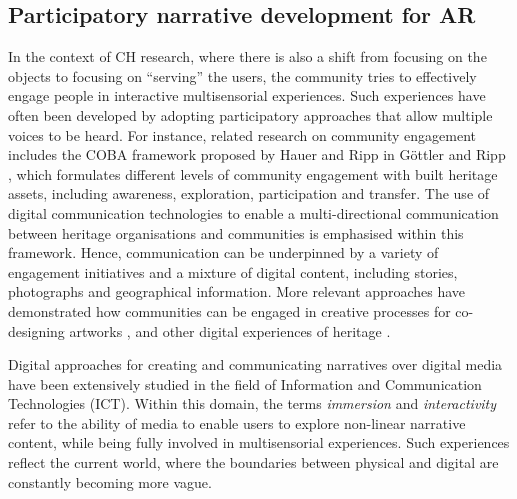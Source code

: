 \documentclass[acmlarge,screen,dvipsnames]{acmart}
\begin{document}
\subsection{Participatory narrative development for AR}
In the context of CH research, where there is also a shift from focusing on the objects to focusing on ``serving'' the users, the community tries to effectively engage people in interactive multisensorial experiences. Such experiences have often been developed by adopting participatory approaches that allow multiple voices to be heard. \color{black}
For instance, related research on community engagement includes the COBA framework proposed by Hauer and Ripp in G{\"o}ttler and Ripp
\cite{icomos1812}, which formulates different levels of community engagement
with built heritage assets, including awareness, exploration, participation
and transfer. The use of digital communication technologies to
enable a multi-directional communication between heritage organisations and
communities is emphasised within this framework. Hence, communication can be underpinned by a variety of engagement initiatives and a mixture of digital content, including stories, photographs and geographical information. More relevant approaches have demonstrated how
communities can be engaged in creative processes for co-designing artworks
\cite{656aab9e240d4479bf2872665a590233}, and other digital experiences of
heritage \cite{ Avram:2019:CGL:3358680.3348793, Fox:2014:CHS:2598510.2598563,
Albouys-Perrois:2018:TMA:3173574.3174203}. 

\color{blue}
Digital approaches for creating and communicating narratives over digital media have been extensively studied in the field of Information and Communication Technologies (ICT). Within this domain, the terms \emph{immersion} and \emph{interactivity} refer to the ability of media to enable users to explore non-linear narrative content, while being fully involved in multisensorial experiences. Such experiences reflect the current world, where the boundaries between physical and digital are constantly becoming more vague.
\end{document}
